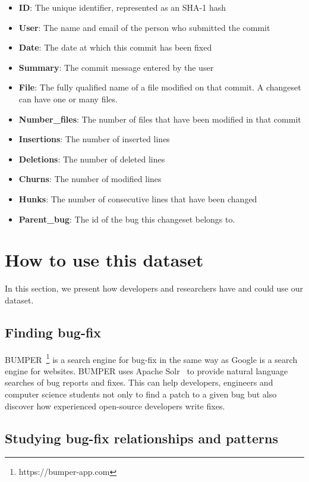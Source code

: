 \documentclass{sig-alternate-05-2015}
\begin{document}
\begin{itemize}

  \item 	\textbf{ID}: The unique identifier, represented as an SHA-1
  hash
  \item 	\textbf{User}: The name and email of the person who
  submitted the commit
  \item 	\textbf{Date}: The date at which this commit has been fixed
  \item 	\textbf{Summary}: The commit message entered by the user
  \item 	\textbf{File}: The fully qualified name of a file modified on
  that commit. A changeset can have one or many files.
  \item 	\textbf{Number\_files}: The number of files that have been
  modified in that commit
  \item 	\textbf{Insertions}: The number of inserted lines
  \item 	\textbf{Deletions}: The number of deleted lines
  \item 	\textbf{Churns}: The number of modified lines
  \item 	\textbf{Hunks}: The number of consecutive lines that have
  been changed
  \item 	\textbf{Parent\_bug}: The id of the bug this changeset belongs
  to.
\end{itemize}


\section{How to use this dataset}

In this section, we present how developers and researchers have and could use our dataset.

\subsection{Finding bug-fix}
\label{subs:Bug Fixing}

BUMPER~\cite{Nayrolles2015d,Nayrolles2016}\footnote{https://bumper-app.com} is a search engine for bug-fix in the same way as Google is a search engine for websites. BUMPER uses Apache Solr~\cite{Nayrolles2014b} to provide natural language searches of bug reports and fixes.
This can help developers, engineers and computer science students not only to find a patch to a given bug but also discover how experienced open-source developers write fixes.

\subsection{Studying bug-fix relationships and patterns}
\label{subs:Studying bug-fix relationships}
\end{document}
